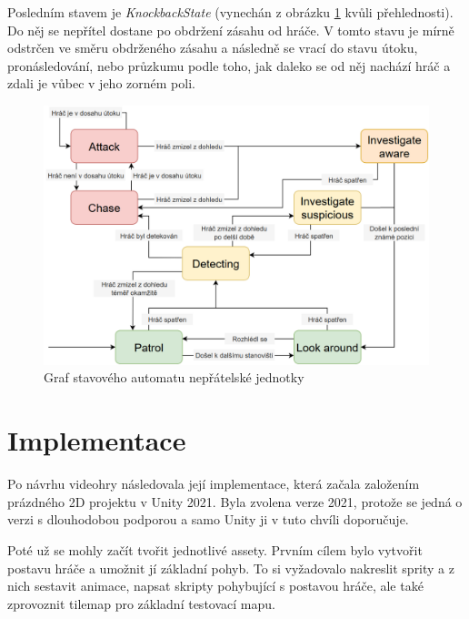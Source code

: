 \documentclass[FM,Proj,bw]{tulthesis}
\begin{document}
	Posledním stavem je \textit{KnockbackState} (vynechán z obrázku \ref{imgFSM} kvůli přehlednosti). Do něj se nepřítel dostane po obdržení zásahu od hráče. V tomto stavu je mírně odstrčen ve směru obdrženého zásahu a následně se vrací do stavu útoku, pronásledování, nebo průzkumu podle toho, jak daleko se od něj nachází hráč a zdali je vůbec v jeho zorném poli.
	
	\begin{figure}[ht]
		\centering
		\includegraphics[width=\textwidth]{img/FSM}
		\caption{Graf stavového automatu nepřátelské jednotky}
		\label{imgFSM}
	\end{figure}
	
	
	\chapter{Implementace}
	\label{chp4}
	
	Po návrhu videohry následovala její implementace, která začala založením prázdného 2D projektu v Unity 2021. Byla zvolena verze 2021, protože se jedná o verzi s dlouhodobou podporou a samo Unity ji v tuto chvíli doporučuje.
	
	Poté už se mohly začít tvořit jednotlivé assety. Prvním cílem bylo vytvořit postavu hráče a umožnit jí základní pohyb. To si vyžadovalo nakreslit sprity a z nich sestavit animace, napsat skripty pohybující s postavou hráče, ale také zprovoznit tilemap pro základní testovací mapu.
	
\end{document}
